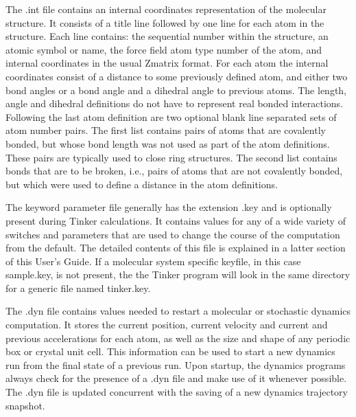 \documentclass[letterpaper,11pt,english]{sphinxmanual}
\begin{document}
\sphinxAtStartPar
The .int file contains an internal coordinates representation of the molecular structure. It consists of a title line followed by one line for each atom in the structure. Each line contains: the sequential number within the structure, an atomic symbol or name, the force field atom type number of the atom, and internal coordinates in the usual Z\sphinxhyphen{}matrix format. For each atom the internal coordinates consist of a distance to some previously defined atom, and either two bond angles or a bond angle and a dihedral angle to previous atoms. The length, angle and dihedral definitions do not have to represent real bonded interactions. Following the last atom definition are two optional blank line separated sets of atom number pairs. The first list contains pairs of atoms that are covalently bonded, but whose bond length was not used as part of the atom definitions. These pairs are typically used to close ring structures. The second list contains bonds that are to be broken, i.e., pairs of atoms that are not covalently bonded, but which were used to define a distance in the atom definitions.

\sphinxAtStartPar
{}

\sphinxAtStartPar
The keyword parameter file generally has the extension .key and is optionally present during Tinker calculations. It contains values for any of a wide variety of switches and parameters that are used to change the course of the computation from the default. The detailed contents of this file is explained in a latter section of this User’s Guide. If a molecular system specific keyfile, in this case sample.key, is not present, the the Tinker program will look in the same directory for a generic file named tinker.key.

\sphinxAtStartPar
{}

\sphinxAtStartPar
The .dyn file contains values needed to restart a molecular or stochastic dynamics computation. It stores the current position, current velocity and current and previous accelerations for each atom, as well as the size and shape of any periodic box or crystal unit cell. This information can be used to start a new dynamics run from the final state of a previous run. Upon startup, the dynamics programs always check for the presence of a .dyn file and make use of it whenever possible. The .dyn file is updated concurrent with the saving of a new dynamics trajectory snapshot.

\sphinxAtStartPar
{}
\end{document}

